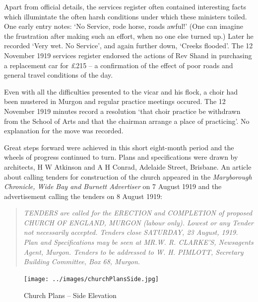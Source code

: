 Apart from official details, the services register often contained interesting facts which illumintate the often harsh conditions under which these ministers toiled. One early entry notes: `No Service, rode horse, roads awful!' (One can imagine the frustration after making such an effort, when no one else turned up.) Later he recorded `Very wet. No Service', and again further down, `Creeks flooded'. The 12 November 1919 services register endorsed the actions of Rev Shand in purchasing a replacement car for \pounds215 -- a confirmation of the effect of poor roads and general travel conditions of the day.



Even with all the difficulties presented to the vicar and his flock, a choir had been mustered in Murgon and regular practice meetings occured. The 12 November 1919 minutes record a resolution `that choir practice be withdrawn from the School of Arts and that the chairman arrange a place of practicing'. No explanation for the move was recorded.



Great steps forward were achieved in this short eight-month period and the wheels of progress continued to turn. Plans and specifications were drawn by architects, H W Atkinson and A H Conrad, Adelaide Street, Brisbane. An article about calling tenders for construction of the church appeared in the \emph{Maryborough Chronicle, Wide Bay and Burnett Advertiser} on 7 August 1919 and the advertisement calling the tenders on 8 August 1919:



\begin{quote}

\emph{TENDERS are called for the ERECTION and COMPLETION of proposed CHURCH OF ENGLAND, MURGON (labour only). Lowest or any Tender not necessarily accepted. Tenders close SATURDAY, 23 August, 1919. Plan and Specifications may be seen at MR.W. R. CLARKE'S, Newsagents Agent, Murgon. Tenders to be addressed to W. H. PIMLOTT, Secretary Building Committee, Box 68, Murgon.}

\end{quote}









\begin{figure}
\begin{center}
\texttt{[image: ../images/churchPlansSide.jpg]}
\caption{Church Plans -- Side Elevation}
\end{center}
\end{figure}











